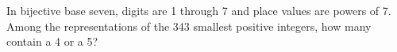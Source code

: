 In bijective base seven, digits are 1 through 7 and place values are powers of 7. Among the representations of the 343 smallest positive integers, how many contain a 4 or a 5?
